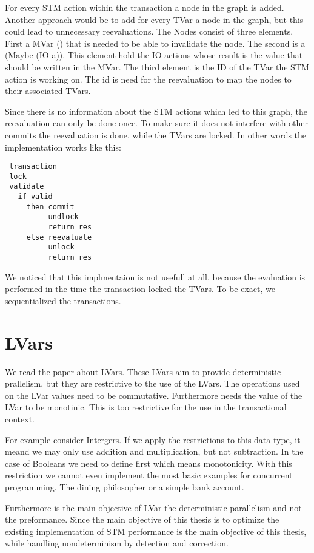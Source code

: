\documentclass[a4paper,10pt]{article}
\begin{document}
For every STM action within the transaction a node in the graph is added. Another approach would be to add for every
TVar a node in the graph, but this could lead to unnecessary reevaluations.
The Nodes consist of three elements. First a MVar () that is needed to be able to invalidate the node. The second is 
a (Maybe (IO a)). This element hold the IO actions whose result is the value that should be written in the MVar.
The third element is the ID of the TVar the STM action is working on. The id is need for the reevaluation to 
map the nodes to their associated TVars.

Since there is no information about the STM actions which led to this graph, the reevaluation can only be done once.
To make sure it does not interfere with other commits the reevaluation is done, while the TVars are locked. 
In other words the implementation works like this:
\begin{lstlisting}
 transaction
 lock
 validate
   if valid
     then commit
          undlock 
          return res
     else reevaluate
          unlock 
          return res
\end{lstlisting}
We noticed that this implmentaion is not usefull at all, because the evaluation is performed in the time the transaction locked the 
TVars. To be exact, we sequentialized the transactions.

\section{LVars}
We read the paper about LVars\cite{kuper2013lvars}. These LVars aim to provide deterministic prallelism, but they are restrictive to the use
of the LVars. The operations used on the LVar values need to be commutative. Furthermore needs the value of the LVar to be monotinic. This 
is too restrictive for the use in the transactional context.

For example consider Intergers. If we apply the restrictions to this data type, it meand we may only use addition and multiplication, but not
subtraction. In the case of Booleans we need to define first which means monotonicity. With this restriction we cannot even implement the most 
basic examples for concurrent programming. The dining philosopher or a simple bank account. 

Furthermore is the main objective of LVar the deterministic parallelism and not the preformance. Since the main objective of this thesis is 
to optimize the existing implementation of STM performance is the main objective of this thesis, while handling nondeterminism by detection
and correction.
\end{document}
